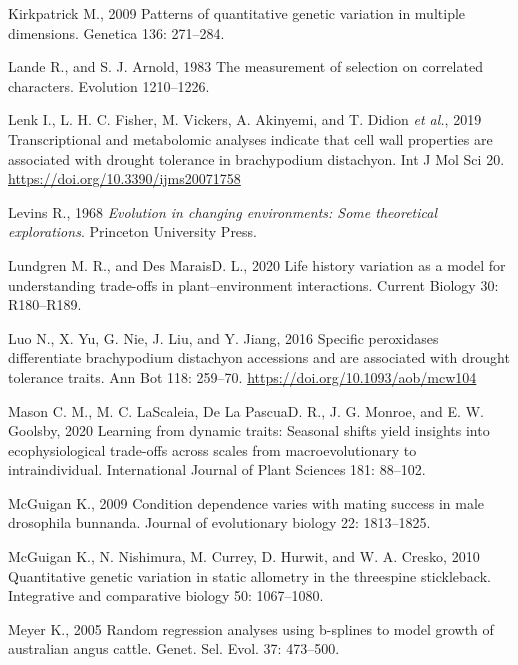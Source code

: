 \documentclass[jou,floatsintext]{apa6}
\begin{document}
\leavevmode\hypertarget{ref-kirkpatrick2009patterns}{}%
Kirkpatrick M., 2009 Patterns of quantitative genetic variation in multiple dimensions. Genetica 136: 271--284.

\leavevmode\hypertarget{ref-lande1983measurement}{}%
Lande R., and S. J. Arnold, 1983 The measurement of selection on correlated characters. Evolution 1210--1226.

\leavevmode\hypertarget{ref-lenk2019transcriptional}{}%
Lenk I., L. H. C. Fisher, M. Vickers, A. Akinyemi, and T. Didion \emph{et al.}, 2019 Transcriptional and metabolomic analyses indicate that cell wall properties are associated with drought tolerance in brachypodium distachyon. Int J Mol Sci 20. \url{https://doi.org/10.3390/ijms20071758}

\leavevmode\hypertarget{ref-levins1968evolution}{}%
Levins R., 1968 \emph{Evolution in changing environments: Some theoretical explorations}. Princeton University Press.

\leavevmode\hypertarget{ref-lundgren2020lifehistory}{}%
Lundgren M. R., and Des MaraisD. L., 2020 Life history variation as a model for understanding trade-offs in plant--environment interactions. Current Biology 30: R180--R189.

\leavevmode\hypertarget{ref-luo2016specific}{}%
Luo N., X. Yu, G. Nie, J. Liu, and Y. Jiang, 2016 Specific peroxidases differentiate brachypodium distachyon accessions and are associated with drought tolerance traits. Ann Bot 118: 259--70. \url{https://doi.org/10.1093/aob/mcw104}

\leavevmode\hypertarget{ref-mason2020learning}{}%
Mason C. M., M. C. LaScaleia, De La PascuaD. R., J. G. Monroe, and E. W. Goolsby, 2020 Learning from dynamic traits: Seasonal shifts yield insights into ecophysiological trade-offs across scales from macroevolutionary to intraindividual. International Journal of Plant Sciences 181: 88--102.

\leavevmode\hypertarget{ref-mcguigan2009condition}{}%
McGuigan K., 2009 Condition dependence varies with mating success in male drosophila bunnanda. Journal of evolutionary biology 22: 1813--1825.

\leavevmode\hypertarget{ref-mcguigan2010quantitative}{}%
McGuigan K., N. Nishimura, M. Currey, D. Hurwit, and W. A. Cresko, 2010 Quantitative genetic variation in static allometry in the threespine stickleback. Integrative and comparative biology 50: 1067--1080.

\leavevmode\hypertarget{ref-meyer2005randomregression}{}%
Meyer K., 2005 Random regression analyses using b-splines to model growth of australian angus cattle. Genet. Sel. Evol. 37: 473--500.
\end{document}

